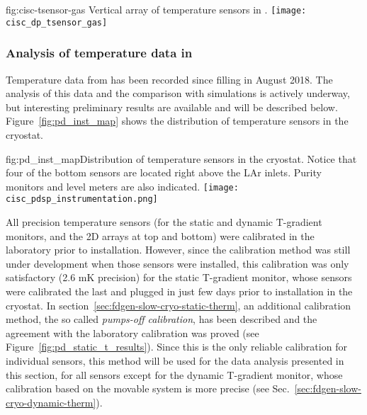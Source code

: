 \begin{dunefigure}{fig:cisc-tsensor-gas}
  {Vertical array of temperature sensors in .
  }
 \texttt{[image: cisc\_dp\_tsensor\_gas]}
\end{dunefigure}

\subsubsection{Analysis of temperature data in }
\label{sec:fdgen-slow-cryo-temp-ana}


Temperature data from  has been recorded since  filling %
in August 2018. The analysis of this data and the comparison with  simulations is actively underway, but interesting preliminary results are available and will be described below. Figure~\ref{fig:pd_inst_map} shows the distribution of temperature sensors in the  cryostat.  

\begin{dunefigure}{fig:pd_inst_map}{Distribution of temperature sensors in the  cryostat. Notice that four of the bottom sensors are located right above the LAr inlets. Purity monitors and level meters are also indicated. }
  \texttt{[image: cisc\_pdsp\_instrumentation.png]}%
\end{dunefigure}


All precision temperature sensors (for the static and dynamic T-gradient monitors,  and the 2D arrays at top and bottom) were calibrated in the laboratory prior to installation. However, since the calibration method was still under development when those sensors 
were installed, this calibration was only satisfactory (2.6 mK precision) for the static T-gradient monitor, whose sensors were calibrated the last and  plugged in just few days prior to installation in the cryostat. In section~\ref{sec:fdgen-slow-cryo-static-therm}, an additional calibration method, the so called {\it pumps-off calibration}, has been described and the agreement with the laboratory calibration was proved (see Figure~\ref{fig:pd_static_t_results}). Since this is the only reliable calibration for individual sensors, this method will be used for the data analysis presented in this section, for all sensors except for the dynamic T-gradient monitor, whose calibration based on the movable system is more precise (see Sec.~\ref{sec:fdgen-slow-cryo-dynamic-therm}). 


